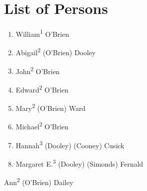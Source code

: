 \chapter{List of Persons}
\begin{enumerate}
	\item \label{per:William1OBrien} William\textsuperscript{1} O'Brien
	\item \label{per:Abigail2OBrien} Abigail\textsuperscript{2} (O'Brien) Dooley
	\item \label{per:John2OBrien} John\textsuperscript{2} O'Brien
	\item \label{per:Edward2OBrien} Edward\textsuperscript{2} O'Brien
	\item \label{per:Mary2OBrien} Mary\textsuperscript{2} (O'Brien) Ward
	\item \label{per:Michael2OBrien} Michael\textsuperscript{2} O'Brien
	\item \label{per:Hannah3Dooley} Hannah\textsuperscript{3} (Dooley) (Cooney) Cusick
	\item \label{per:Margaret3Dooley} Margaret E.\textsuperscript{3} (Dooley) (Simonds) Fernald
\end{enumerate}

Ann\textsuperscript{2} (O'Brien) Dailey